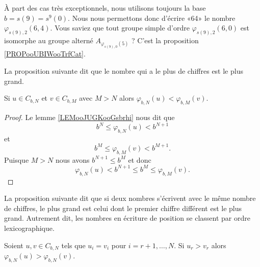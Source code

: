 \begin{normaltext}
    À part des cas très exceptionnels, nous utilisons toujours la base \( b=s(9)=s^9(0)\). Nous nous permettons donc d'écrire «64» le nombre \( \varphi_{s(9), 2}(6,4)\). Vous saviez que tout groupe simple d'ordre \( \varphi_{s(9), 2}(6,0)\) est isomorphe au groupe alterné \( A_{\varphi_{s(9),0}(5)}\) ? C'est la proposition \ref{PROPooUBIWooTrfCat}.
\end{normaltext}


La proposition suivante dit que le nombre qui a le plus de chiffres est le plus grand.
\begin{proposition}
    Si \( u\in C_{b,N}\) et \( v\in C_{b,M}\) avec \( M>N\) alors \( \varphi_{b,N}(u)<\varphi_{b,M}(v)\).
\end{proposition}

\begin{proof}
    Le lemme  \ref{LEMooJUGKooGsbrhi} nous dit que
    \begin{equation}
        b^N\leq \varphi_{b,N}(u)< b^{N+1}
    \end{equation}
    et
    \begin{equation}
        b^M\leq \varphi_{b,M}(v)< b^{M+1}.
    \end{equation}
    Puisque \( M>N\) nous avons \( b^{N+1}\leq b^M\) et donc
    \begin{equation}
        \varphi_{b,N}(u)< b^{N+1}\leq b^M\leq \varphi_{b,M}(v).
    \end{equation}
\end{proof}

La proposition suivante dit que si deux nombres s'écrivent avec le même nombre de chiffres, le plus grand est celui dont le premier chiffre différent est le plus grand. Autrement dit, les nombres en écriture de position se classent par ordre lexicographique.

\begin{proposition}
    Soient \( u,v\in C_{b,N}\) tels que \( u_i=v_i\) pour \( i=r+1,\ldots, N\). Si \( u_r>v_r\) alors \( \varphi_{b,N}(u)>\varphi_{b,N}(v)\).
\end{proposition}

